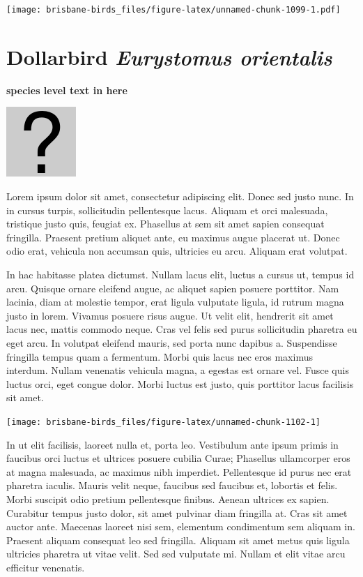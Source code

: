 \documentclass[]{book}
\let\origfigure\figure
\let\endorigfigure\endfigure
\renewenvironment{figure}[1][2] {
  \expandafter\origfigure\expandafter[H]
} {
  \endorigfigure
}
\begin{document}
\texttt{[image: brisbane-birds\_files/figure-latex/unnamed-chunk-1099-1.pdf]}

\section{\texorpdfstring{Dollarbird \emph{Eurystomus
orientalis}}{Dollarbird Eurystomus orientalis}}\label{dollarbird-eurystomus-orientalis}

\textbf{species level text in here}

\begin{figure}
\centering
\includegraphics{assets/missing.png}
\caption{No image for species}
\end{figure}

Lorem ipsum dolor sit amet, consectetur adipiscing elit. Donec sed justo
nunc. In in cursus turpis, sollicitudin pellentesque lacus. Aliquam et
orci malesuada, tristique justo quis, feugiat ex. Phasellus at sem sit
amet sapien consequat fringilla. Praesent pretium aliquet ante, eu
maximus augue placerat ut. Donec odio erat, vehicula non accumsan quis,
ultricies eu arcu. Aliquam erat volutpat.

In hac habitasse platea dictumst. Nullam lacus elit, luctus a cursus ut,
tempus id arcu. Quisque ornare eleifend augue, ac aliquet sapien posuere
porttitor. Nam lacinia, diam at molestie tempor, erat ligula vulputate
ligula, id rutrum magna justo in lorem. Vivamus posuere risus augue. Ut
velit elit, hendrerit sit amet lacus nec, mattis commodo neque. Cras vel
felis sed purus sollicitudin pharetra eu eget arcu. In volutpat eleifend
mauris, sed porta nunc dapibus a. Suspendisse fringilla tempus quam a
fermentum. Morbi quis lacus nec eros maximus interdum. Nullam venenatis
vehicula magna, a egestas est ornare vel. Fusce quis luctus orci, eget
congue dolor. Morbi luctus est justo, quis porttitor lacus facilisis sit
amet.

\begin{figure}
\texttt{[image: brisbane-birds\_files/figure-latex/unnamed-chunk-1102-1]} \caption{insert figure caption}\label{fig:unnamed-chunk-1102}
\end{figure}

In ut elit facilisis, laoreet nulla et, porta leo. Vestibulum ante ipsum
primis in faucibus orci luctus et ultrices posuere cubilia Curae;
Phasellus ullamcorper eros at magna malesuada, ac maximus nibh
imperdiet. Pellentesque id purus nec erat pharetra iaculis. Mauris velit
neque, faucibus sed faucibus et, lobortis et felis. Morbi suscipit odio
pretium pellentesque finibus. Aenean ultrices ex sapien. Curabitur
tempus justo dolor, sit amet pulvinar diam fringilla at. Cras sit amet
auctor ante. Maecenas laoreet nisi sem, elementum condimentum sem
aliquam in. Praesent aliquam consequat leo sed fringilla. Aliquam sit
amet metus quis ligula ultricies pharetra ut vitae velit. Sed sed
vulputate mi. Nullam et elit vitae arcu efficitur venenatis.
\end{document}
